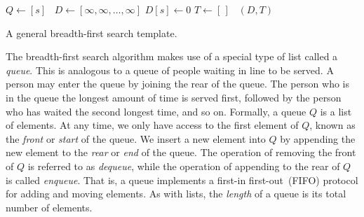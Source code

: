 \begin{algorithm}[!htpb]
\dontprintsemicolon  %
\BlankLine
$Q \leftarrow [s]$~ \;
$D \leftarrow [\infty, \infty, \dots, \infty]$ \;
$D[s] \leftarrow 0$\;
$T \leftarrow [\,]$~\;
\Return $(D, T)$\;
\caption{A general breadth-first search template.}
\label{alg:graph_algorithms:breadth_first_search_template}
\end{algorithm}

The breadth-first search algorithm makes use of a special type of list
called a \emph{queue}. This is analogous to a queue of people waiting
in line to be served. A person may enter the queue by joining the rear
of the queue. The person who is in the queue the longest amount of
time is served first, followed by the person who has waited the second
longest time, and so on. Formally, a queue $Q$ is a list of
elements. At any time, we only have access to the first element of
$Q$, known as the \emph{front} or \emph{start} of the queue. We insert
a new element into $Q$ by appending the new element to the \emph{rear}
or \emph{end} of the queue. The operation of removing the front of $Q$
is referred to as \emph{dequeue}, while the operation of appending to
the rear of $Q$ is called \emph{enqueue}. That is, a queue implements
a first-in first-out~(FIFO) protocol for adding and moving
elements. As with lists, the \emph{length} of a queue is its total
number of elements.

